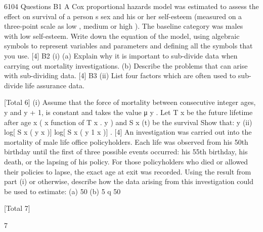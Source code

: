 \documentclass[a4paper,12pt]{article}
\begin{document}
\begin{enumerate}



 6104 Questions
B1
A Cox proportional hazards model was estimated to assess the effect on survival of a
person s sex and his or her self-esteem (measured on a three-point scale as low ,
medium or high ). The baseline category was males with low self-esteem.
Write down the equation of the model, using algebraic symbols to represent variables
and parameters and defining all the symbols that you use.
[4]
B2
(i)
(a) Explain why it is important to sub-divide data when carrying out
mortality investigations.
(b) Describe the problems that can arise with sub-dividing data.
[4]
B3
(ii) List four factors which are often used to sub-divide life assurance data.

[Total 6]
(i) Assume that the force of mortality between consecutive integer ages, y and
y + 1, is constant and takes the value μ y .
Let T x be the future lifetime after age x ( x
function of T x .
y ) and S x (t) be the survival
Show that:
y
(ii)
log[ S x ( y x )] log[ S x ( y 1 x )] .
[4]
An investigation was carried out into the mortality of male life office
policyholders. Each life was observed from his 50th birthday until the first of
three possible events occurred: his 55th birthday, his death, or the lapsing of
his policy. For those policyholders who died or allowed their policies to lapse,
the exact age at exit was recorded.
Using the result from part (i) or otherwise, describe how the data arising from
this investigation could be used to estimate:
(a) 50
(b) 5 q 50

[Total 7]

 7










\end{enumerate}
\end{document}
